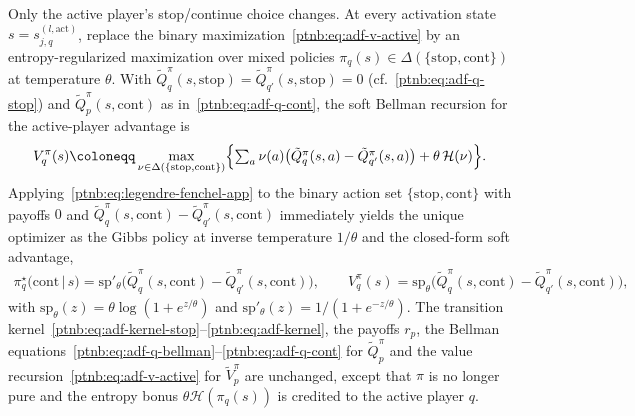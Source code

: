 Only the active player's stop/continue choice changes. At every activation state $s = s_{j,q}^{(l,
    \mathrm{act})}$, replace the binary maximization~\eqref{ptnb:eq:adf-v-active} by an entropy-regularized
maximization over mixed policies $\pi_q(s) \in \Delta(\{\mathrm{stop},\mathrm{cont}\})$ at
temperature $\theta$. With $\tilde Q_q^\pi(s, \mathrm{stop}) = \tilde Q_{q'}^\pi(s, \mathrm{stop})
    = 0$ (cf.~\eqref{ptnb:eq:adf-q-stop}) and $\tilde Q_p^\pi(s, \mathrm{cont})$ as
in~\eqref{ptnb:eq:adf-q-cont}, the soft Bellman recursion for the active-player advantage is
\begin{align}\label{ptnb:eq:softplus-soft-bellman}
    V_q^\pi(s)
    \coloneqq
    \max_{\nu \in \Delta(\{\mathrm{stop},\mathrm{cont}\})} \Bigl\{
    \textstyle\sum_{a} \nu(a)\bigl(\tilde Q_q^\pi(s, a) - \tilde Q_{q'}^\pi(s, a)\bigr)
    + \theta\, \mathcal{H}(\nu)
    \Bigr\}.
\end{align}
Applying~\eqref{ptnb:eq:legendre-fenchel-app} to the binary action set $\{\mathrm{stop},\mathrm{cont}\}$
with payoffs $0$ and $\tilde Q_q^\pi(s, \mathrm{cont}) - \tilde Q_{q'}^\pi(s, \mathrm{cont})$
immediately yields the unique optimizer as the Gibbs policy at inverse temperature $1/\theta$ and
the closed-form soft advantage,
\begin{align}\label{ptnb:eq:softplus-policy}
    \pi_q^\star\!\bigl(\mathrm{cont} \,\big|\, s\bigr)
    = \mathrm{sp}'_\theta\bigl(\tilde Q_q^\pi(s, \mathrm{cont}) - \tilde Q_{q'}^\pi(s,
    \mathrm{cont})\bigr),
    \qquad
    V_q^\pi(s)
    = \mathrm{sp}_\theta\bigl(\tilde Q_q^\pi(s, \mathrm{cont}) - \tilde Q_{q'}^\pi(s,
    \mathrm{cont})\bigr),
\end{align}
with $\mathrm{sp}_\theta(z) = \theta\log(1+e^{z/\theta})$ and $\mathrm{sp}'_\theta(z) =
    1/(1+e^{-z/\theta})$. The transition kernel~\eqref{ptnb:eq:adf-kernel-stop}--\eqref{ptnb:eq:adf-kernel}, the
payoffs $r_p$, the Bellman equations~\eqref{ptnb:eq:adf-q-bellman}--\eqref{ptnb:eq:adf-q-cont} for $\tilde
    Q_p^\pi$ and the value recursion~\eqref{ptnb:eq:adf-v-active} for $\tilde V_p^\pi$ are unchanged, except
that $\pi$ is no longer pure and the entropy bonus $\theta\mathcal{H}(\pi_q(s))$ is credited to the
active player $q$.

